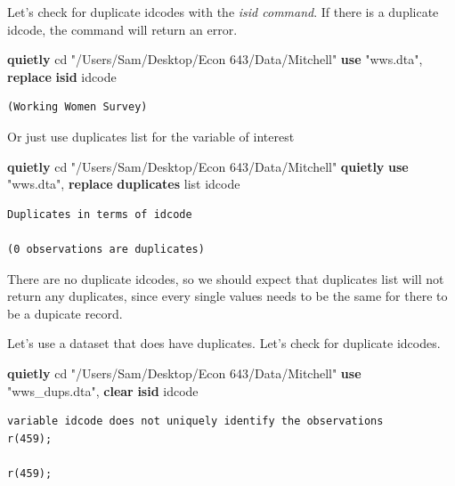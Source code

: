 \documentclass[
]{book}
\newenvironment{Shaded}{\begin{snugshade}}{\end{snugshade}}
\newcommand{\KeywordTok}[1]{\textcolor[rgb]{0.13,0.29,0.53}{\textbf{#1}}}
\newcommand{\NormalTok}[1]{#1}
\newcommand{\OtherTok}[1]{\textcolor[rgb]{0.56,0.35,0.01}{#1}}
\newcommand{\StringTok}[1]{\textcolor[rgb]{0.31,0.60,0.02}{#1}}
\begin{document}
Let's check for duplicate idcodes with the \emph{isid command}. If there is a duplicate idcode, the command will return an error.

\begin{Shaded}
\begin{Highlighting}[]
\KeywordTok{quietly}\NormalTok{ cd }\StringTok{"/Users/Sam/Desktop/Econ 643/Data/Mitchell"}
\KeywordTok{use} \StringTok{"wws.dta"}\NormalTok{, }\KeywordTok{replace}
\KeywordTok{isid}\NormalTok{ idcode}
\end{Highlighting}
\end{Shaded}

\begin{verbatim}
(Working Women Survey)
\end{verbatim}

Or just use duplicates list for the variable of interest

\begin{Shaded}
\begin{Highlighting}[]
\KeywordTok{quietly}\NormalTok{ cd }\StringTok{"/Users/Sam/Desktop/Econ 643/Data/Mitchell"}
\KeywordTok{quietly} \KeywordTok{use} \StringTok{"wws.dta"}\NormalTok{, }\KeywordTok{replace}
\KeywordTok{duplicates} \OtherTok{list}\NormalTok{ idcode}
\end{Highlighting}
\end{Shaded}

\begin{verbatim}
Duplicates in terms of idcode

(0 observations are duplicates)
\end{verbatim}

There are no duplicate idcodes, so we should expect that duplicates list will not return any duplicates, since every single values needs to be the same for there to be a dupicate record.

Let's use a dataset that does have duplicates. Let's check for duplicate idcodes.

\begin{Shaded}
\begin{Highlighting}[]
\KeywordTok{quietly}\NormalTok{ cd }\StringTok{"/Users/Sam/Desktop/Econ 643/Data/Mitchell"}
\KeywordTok{use} \StringTok{"wws\_dups.dta"}\NormalTok{, }\KeywordTok{clear}
\KeywordTok{isid}\NormalTok{ idcode}
\end{Highlighting}
\end{Shaded}

\begin{verbatim}
variable idcode does not uniquely identify the observations
r(459);

r(459);
\end{verbatim}
\end{document}
